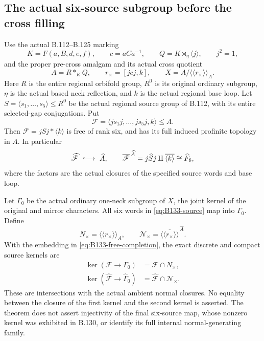 \subsection*{The actual six-source subgroup before the cross filling}

\label{stmt:B133}
Use the actual B.112--B.125 marking
\[
 K=F(a,B,d,e,f),\qquad c=aCa^{-1},\qquad
 Q=K\rtimes_\eta\langle j\rangle,\qquad j^2=1,
\]
and the proper pre-cross amalgam and its actual cross quotient
\begin{equation}\label{eq:B133-pre-cross}
 A=R*_{K}Q,\qquad
 r_\times=[jcj,k],\qquad
 X=A/\langle\!\langle r_\times\rangle\!\rangle_A.
\end{equation}
Here $R$ is the entire regional orbifold group, $R^0$ is its
original ordinary subgroup, $\eta$ is the actual based neck
reflection, and $k$ is the actual regional base loop.
Let $S=\langle s_1,\ldots,s_5\rangle\leq R^0$ be the actual
regional source group of B.112, with its entire selected-gap
conjugations. Put
\begin{equation}\label{eq:B133-source}
 \mathscr F=\langle js_1j,\ldots,js_5j,k\rangle\leq A.
\end{equation}
Then $\mathscr F=jSj*\langle k\rangle$ is free of rank six,
and has its full induced profinite topology in $A$. In particular
\begin{equation}\label{eq:B133-free-completion}
 \widehat{\mathscr F}\ \lhook\joinrel\longrightarrow\ \widehat A,
 \qquad
 \overline{\mathscr F}^{\,\widehat A}
   =j\widehat Sj\amalg\overline{\langle k\rangle}
   \cong\widehat F_6,
\end{equation}
where the factors are the actual closures of the specified source
words and base loop.

Let $\Gamma_0$ be the actual ordinary one-neck subgroup of $X$,
the joint kernel of the original and mirror characters. All six
words in \eqref{eq:B133-source} map into $\Gamma_0$. Define
\[
 N_\times=\langle\!\langle r_\times\rangle\!\rangle_A,
 \qquad
 \mathcal N_\times=
 \overline{\langle\!\langle r_\times\rangle\!\rangle}^{\,\widehat A}.
\]
With the embedding in \eqref{eq:B133-free-completion}, the exact
discrete and compact source kernels are
\begin{equation}\label{eq:B133-kernel-intersections}
 \begin{aligned}
 \ker(\mathscr F\longrightarrow\Gamma_0)
    &=\mathscr F\cap N_\times,\\
 \ker(\widehat{\mathscr F}\longrightarrow\widehat\Gamma_0)
    &=\widehat{\mathscr F}\cap\mathcal N_\times.
 \end{aligned}
\end{equation}
These are intersections with the actual ambient normal closures.
No equality between the closure of the first kernel and the second
kernel is asserted. The theorem does not assert injectivity of the
final six-source map, whose nonzero kernel was exhibited in B.130,
or identify its full internal normal-generating family.

